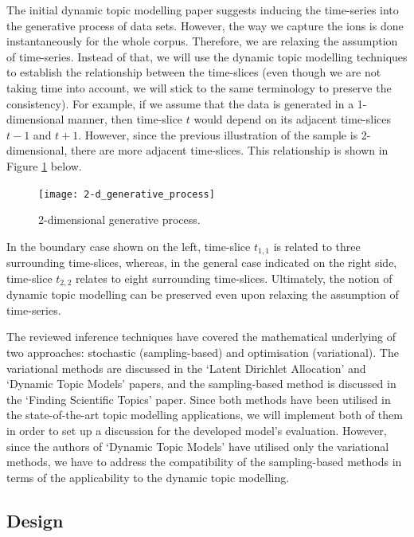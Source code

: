 \documentclass{mprop}
\begin{document}
The initial dynamic topic modelling paper suggests inducing the time-series into the generative process of data sets. However, the way we capture the ions is done instantaneously for the whole corpus. Therefore, we are relaxing the assumption of time-series. Instead of that, we will use the dynamic topic modelling techniques to establish the relationship between the time-slices (even though we are not taking time into account, we will stick to the same terminology to preserve the consistency). For example, if we assume that the data is generated in a 1-dimensional manner, then time-slice $t$ would depend on its adjacent time-slices $t-1$ and $t+1$. However, since the previous illustration of the sample is 2-dimensional, there are more adjacent time-slices. This relationship is shown in Figure \ref{fig:2-d_generative_process} below.
\begin{figure}[H]
  \centering
  \texttt{[image: 2-d\_generative\_process]}
  \caption{2-dimensional generative process.}
  \label{fig:2-d_generative_process}
\end{figure}
In the boundary case shown on the left, time-slice $t_{1,1}$ is related to three surrounding time-slices, whereas, in the general case indicated on the right side, time-slice $t_{2,2}$ relates to eight surrounding time-slices. Ultimately, the notion of dynamic topic modelling can be  preserved even upon relaxing the assumption of time-series.

\par The reviewed inference techniques have covered the mathematical underlying of two approaches: stochastic (sampling-based) and optimisation (variational). The variational methods are discussed in the `Latent Dirichlet Allocation' and `Dynamic Topic Models' papers, and the sampling-based method is discussed in the `Finding Scientific Topics' paper. Since both methods have been utilised in the state-of-the-art topic modelling applications, we will implement both of them in order to set up a discussion for the developed model's evaluation. However, since the authors of `Dynamic Topic Models' have utilised only the variational methods, we have to address the compatibility of the sampling-based methods in terms of the applicability to the dynamic topic modelling.


\subsection{Design}
\end{document}
